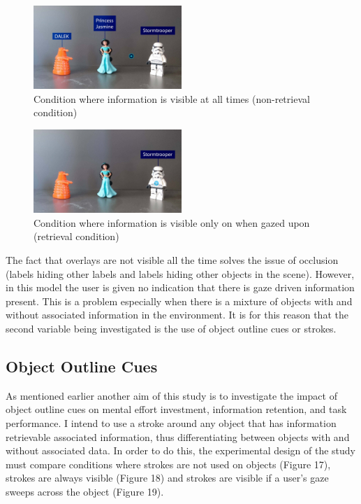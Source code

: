 \documentclass{article}
\begin{document}
\begin{figure}[htbp]
		\hspace{0.25\textwidth}
        \includegraphics[width=0.5\textwidth]{Images/infoActive.jpg}
    	\caption{Condition where information is visible at all times (non-retrieval condition)
}
\end{figure}

\begin{figure}[htbp]
		\hspace{0.25\textwidth}
        \includegraphics[width=0.5\textwidth]{Images/infoPassive.jpg}
    	\caption{Condition where information is visible only on when gazed upon (retrieval condition)
}
\end{figure}

The fact that overlays are not visible all the time solves the issue of occlusion (labels hiding other labels and labels hiding other objects in the scene). However, in this model the user is given no indication that there is gaze driven information present. This is a problem especially when there is a mixture of objects with and without associated information in the environment. It is for this reason that the second variable being investigated is the use of object outline cues or strokes. 

\subsection{Object Outline Cues}
As mentioned earlier another aim of this study is to investigate the impact of object outline cues on mental effort investment, information retention, and task performance. I intend to use a stroke around any object that has information retrievable associated information, thus differentiating between objects with and without associated data. In order to do this, the experimental design of the study must compare conditions where strokes are not used on objects (Figure 17), strokes are always visible (Figure 18) and strokes are visible if a user's gaze sweeps across the object (Figure 19).  
\end{document}
